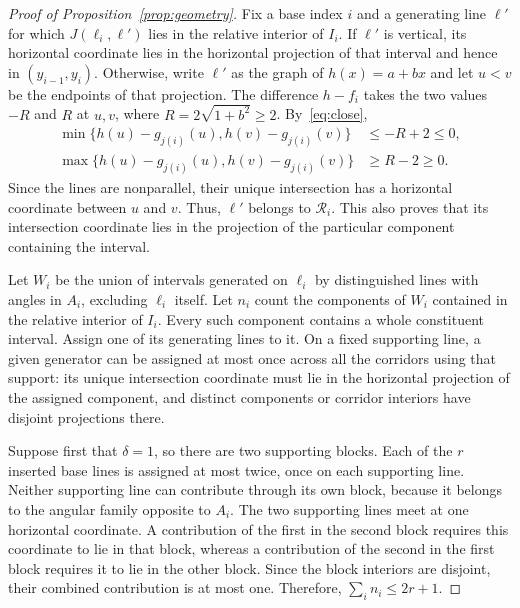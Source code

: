 \documentclass[11pt,letterpaper]{article}
\begin{document}
\begin{proof}[Proof of Proposition~\ref{prop:geometry}]
Fix a base index $i$ and a generating line $\ell'$ for which $J(\ell_i,\ell')$ lies in the relative interior of $I_i$. If $\ell'$ is vertical, its horizontal coordinate lies in the horizontal projection of that interval and hence in $(y_{i-1},y_i)$. Otherwise, write $\ell'$ as the graph of $h(x)=a+bx$ and let $u<v$ be the endpoints of that projection. The difference $h-f_i$ takes the two values $-R$ and $R$ at $u,v$, where $R=2\sqrt{1+b^2}\ge2$. By~\eqref{eq:close},
\begin{equation}\label{eq:intersection}
\begin{aligned}
 \min\{h(u)-g_{j(i)}(u),h(v)-g_{j(i)}(v)\}&\le-R+2\le0,\\
 \max\{h(u)-g_{j(i)}(u),h(v)-g_{j(i)}(v)\}&\ge R-2\ge0.
\end{aligned}
\end{equation}
Since the lines are nonparallel, their unique intersection has a horizontal coordinate between $u$ and $v$. Thus, $\ell'$ belongs to $\mathscr R_i$. This also proves that its intersection coordinate lies in the projection of the particular component containing the interval.

Let $W_i$ be the union of intervals generated on $\ell_i$ by distinguished lines with angles in $A_i$, excluding $\ell_i$ itself. Let $n_i$ count the components of $W_i$ contained in the relative interior of $I_i$. Every such component contains a whole constituent interval. Assign one of its generating lines to it. On a fixed supporting line, a given generator can be assigned at most once across all the corridors using that support: its unique intersection coordinate must lie in the horizontal projection of the assigned component, and distinct components or corridor interiors have disjoint projections there.

Suppose first that $\delta=1$, so there are two supporting blocks. Each of the $r$ inserted base lines is assigned at most twice, once on each supporting line. Neither supporting line can contribute through its own block, because it belongs to the angular family opposite to $A_i$. The two supporting lines meet at one horizontal coordinate. A contribution of the first in the second block requires this coordinate to lie in that block, whereas a contribution of the second in the first block requires it to lie in the other block. Since the block interiors are disjoint, their combined contribution is at most one. Therefore, $\sum_i n_i\le2r+1$.


\end{proof}
\end{document}

